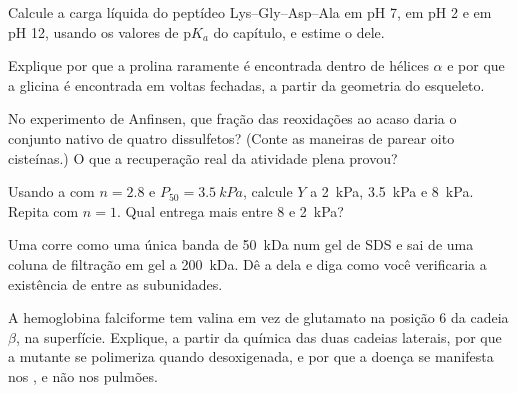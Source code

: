 \begin{exercise}[$\star\star$]\label{exo:b1:proteins:5}
Calcule a carga líquida do peptídeo Lys--Gly--Asp--Ala em pH 7, em pH 2
e em pH 12, usando os valores de p$K_a$ do capítulo, e estime o  dele.
\end{exercise}

\begin{exercise}[$\star\star$]\label{exo:b1:proteins:6}
Explique por que a prolina raramente é encontrada dentro de hélices
$\alpha$ e por que a glicina é encontrada em voltas fechadas, a partir
da geometria do esqueleto.
\end{exercise}

\begin{exercise}[$\star\star$]\label{exo:b1:proteins:7}
No experimento de Anfinsen, que fração das reoxidações ao acaso daria o
conjunto nativo de quatro dissulfetos? (Conte as maneiras de parear oito
cisteínas.) O que a recuperação real da atividade plena provou?
\end{exercise}

\begin{exercise}[$\star\star$]\label{exo:b1:proteins:8}
Usando a  com $n = 2.8$ e $P_{50} = \qty{3.5}{kPa}$,
calcule $Y$ a \qty{2}{kPa}, \qty{3.5}{kPa} e \qty{8}{kPa}. Repita com
$n = 1$. Qual  entrega mais entre \qty{8}{} e \qty{2}{kPa}?
\end{exercise}

\begin{exercise}[$\star\star$]\label{exo:b1:proteins:9}
Uma  corre como uma única banda de \qty{50}{kDa} num gel de SDS
e sai de uma coluna de filtração em gel a \qty{200}{kDa}. Dê a  dela e diga como você verificaria a existência de  entre as subunidades.
\end{exercise}

\begin{exercise}[$\star\star\star$]\label{exo:b1:proteins:10}
A hemoglobina falciforme tem valina em vez de glutamato na posição 6 da
cadeia $\beta$, na superfície. Explique, a partir da química das duas
cadeias laterais, por que a  mutante se polimeriza quando
desoxigenada, e por que a doença se manifesta nos , e não nos
pulmões.
\end{exercise}

